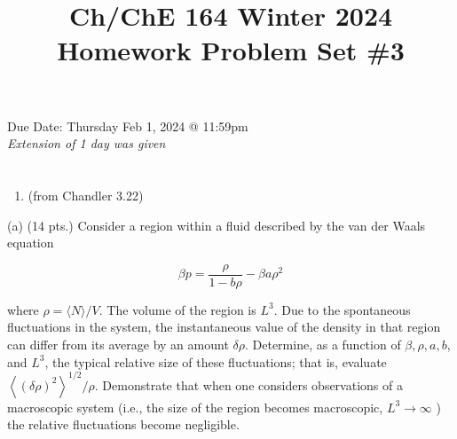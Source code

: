 \documentclass[12pt]{article}
\title{Ch/ChE 164 Winter 2024 
 Homework Problem Set \#3 }
\author{}
\date{}
\begin{document}
\maketitle
Due Date: Thursday Feb 1, 2024 @ 11:59pm\\
\emph{Extension of 1 day was given}
\section{}
\begin{enumerate}
  \item (from Chandler 3.22)
\end{enumerate}

(a) (14 pts.) Consider a region within a fluid described by the van der Waals equation

$$
\beta p=\frac{\rho}{1-b \rho}-\beta a \rho^{2}
$$

where $\rho=\langle N\rangle / V$. The volume of the region is $L^{3}$. Due to the spontaneous fluctuations in the system, the instantaneous value of the density in that region can differ from its average by an amount $\delta \rho$. Determine, as a function of $\beta, \rho, a, b$, and $L^{3}$, the typical relative size of these fluctuations; that is, evaluate $\left\langle(\delta \rho)^{2}\right\rangle^{1 / 2} / \rho$. Demonstrate that when one considers observations of a macroscopic system (i.e., the size of the region becomes macroscopic, $L^{3} \rightarrow \infty$ ) the relative fluctuations become negligible.
\end{document}
